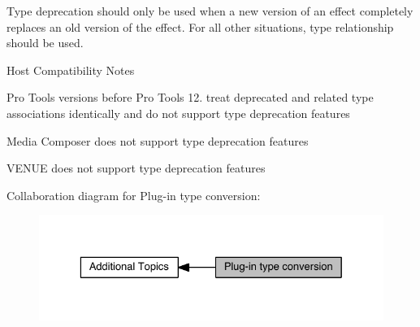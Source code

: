 Type deprecation should only be used when a new version of an effect completely replaces an old version of the effect. For all other situations, type relationship should be used.

\begin{DoxyRefDesc}{Host Compatibility Notes}
\item[\hyperlink{a00380__compatibility_notes000008}{Host Compatibility Notes}]\begin{DoxyItemize}
\item Pro Tools versions before Pro Tools 12. treat deprecated and related type associations identically and do not support type deprecation features \item Media Composer does not support type deprecation features \item V\+E\+N\+U\+E does not support type deprecation features \end{DoxyItemize}
\end{DoxyRefDesc}
Collaboration diagram for Plug-\/in type conversion\+:
\nopagebreak
\begin{figure}[H]
\begin{center}
\leavevmode
\includegraphics[width=329pt]{a00356}
\end{center}
\end{figure}
